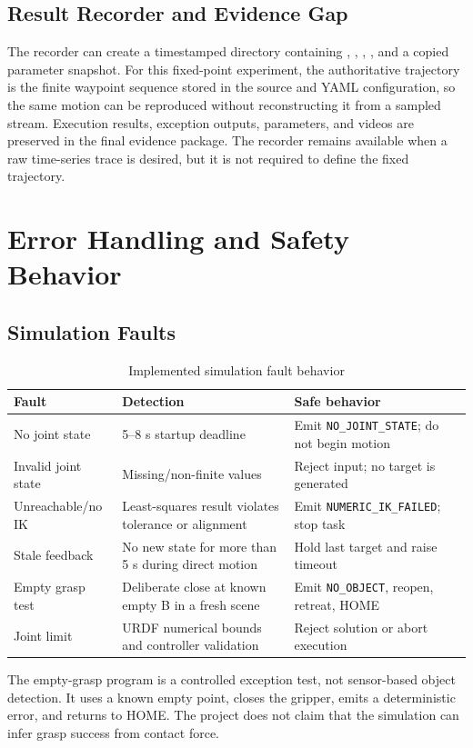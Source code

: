 \documentclass[UTF8,zihao=-4,scheme=chinese,fontset=none]{ctexart}
\begin{document}
\subsection{Result Recorder and Evidence Gap}
The recorder can create a timestamped directory containing , , , , and a copied parameter snapshot. For this fixed-point experiment, the authoritative trajectory is the finite waypoint sequence stored in the source and YAML configuration, so the same motion can be reproduced without reconstructing it from a sampled stream. Execution results, exception outputs, parameters, and videos are preserved in the final evidence package. The recorder remains available when a raw time-series trace is desired, but it is not required to define the fixed trajectory.

\section{Error Handling and Safety Behavior}
\subsection{Simulation Faults}
\begin{table}[H]\centering\caption{Implemented simulation fault behavior}\label{tab:faults}
\begin{tabularx}{\textwidth}{p{4.0cm}p{4.2cm}Y}\toprule Fault & Detection & Safe behavior\\\midrule
No joint state & 5--8 s startup deadline & Emit \texttt{NO\_JOINT\_STATE}; do not begin motion\\
Invalid joint state & Missing/non-finite values & Reject input; no target is generated\\
Unreachable/no IK & Least-squares result violates tolerance or alignment & Emit \texttt{NUMERIC\_IK\_FAILED}; stop task\\
Stale feedback & No new state for more than 5 s during direct motion & Hold last target and raise timeout\\
Empty grasp test & Deliberate close at known empty B in a fresh scene & Emit \texttt{NO\_OBJECT}, reopen, retreat, HOME\\
Joint limit & URDF numerical bounds and controller validation & Reject solution or abort execution\\
\bottomrule\end{tabularx}
\end{table}
The empty-grasp program is a controlled exception test, not sensor-based object detection. It uses a known empty point, closes the gripper, emits a deterministic error, and returns to HOME. The project does not claim that the simulation can infer grasp success from contact force.
\end{document}
